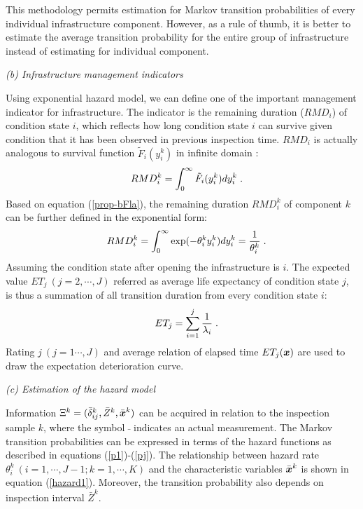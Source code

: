 This methodology permits estimation for Markov transition probabilities of every individual infrastructure component. However, as a rule of thumb, it is better to estimate the average transition probability for the entire group of infrastructure instead of estimating for individual component. 

\textit{(b) Infrastructure management indicators}

Using exponential hazard model, we can define one of the important management indicator for infrastructure. The indicator is the remaining duration ($RMD_i$) of condition state $i$, which reflects how long condition state $i$ can survive given condition that it has been observed in previous inspection time. $RMD_i$ is actually analogous to survival function $\tilde{F}_i(y_i^k)$ in infinite domain \cite{lancaster90}:
\begin{eqnarray}
&& RMD_i^k= \int^{\infty}_{0}\tilde{F}_i(y_i^k)dy_i^k \hspace{1mm}.\label{17}
\end{eqnarray}
Based on equation (\ref{prop-bFla}), the remaining duration $RMD^k_i$ of component $k$ can be further defined in the exponential form:
\begin{eqnarray}
&& RMD_i^k= \int^{\infty}_{0}\exp (-\theta_i^k y_i^k) dy_i^k = \frac{1}{\theta_i^k} \hspace{1mm}.\label{rating}
\end{eqnarray}
Assuming the condition state after opening the infrastructure is $i$. The expected value $ET_j~(j=2,\cdots,J)$ referred as average life expectancy of condition state $j$, is thus a summation of all transition duration from every condition state $i$:
\begin{eqnarray}
&& ET_j=\sum_{i=1}^j \frac{1}{\lambda_i}\hspace{1mm}. \label{hy}
\end{eqnarray}
Rating $j~(j=1\cdots,J)$ and average relation of elapsed time $ET_j(\mbox{\boldmath$x$})$  are used to draw the expectation deterioration curve.

\textit{(c) Estimation of the hazard model}

Information $\Xi^k=(\bar{\delta}_{ij}^k,\bar{Z}^k,\bar{\mbox{\boldmath$x$}}^k)$ can be acquired in relation to the inspection sample $k$, where the symbol $\bar{}$ indicates an actual measurement. The Markov transition probabilities can be expressed in terms of the hazard functions as described in equations (\ref{p1})-(\ref{pj}). The relationship between hazard rate $\theta_i^k~(i=1,\cdots,J-1;k=1,\cdots,K)$ and the characteristic variables $\bar{\mbox{\boldmath$x$}}^k$ is shown in equation (\ref{hazard1}). Moreover, the transition probability also depends on inspection interval $\bar{Z}^k$.

